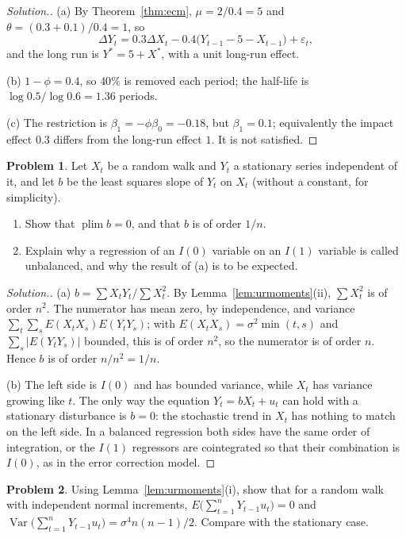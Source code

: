 \documentclass[11pt,a4paper]{article}
\numberwithin{equation}{section}
\DeclareMathOperator{\Var}{Var}
\DeclareMathOperator{\plim}{plim}
\theoremstyle{definition}
\newtheorem{problemx}{Problem}[subsection]
\newenvironment{problem}{\begin{problemx}}{\end{problemx}}
\newenvironment{solution}
  {\renewcommand{\qedsymbol}{}\begin{proof}[\textit{Solution}.]}
  {\end{proof}}
\begin{document}
\begin{solution}
(a) By Theorem~\ref{thm:ecm}, $\mu = 2/0.4 = 5$ and $\theta = (0.3 + 0.1)/0.4 = 1$, so
\[
\Delta Y_t = 0.3\Delta X_t - 0.4\bigl(Y_{t-1} - 5 - X_{t-1}\bigr) + \varepsilon_t ,
\]
and the long run is $Y^* = 5 + X^*$, with a unit long-run effect.

(b) $1 - \phi = 0.4$, so $40\%$ is removed each period; the half-life is $\log 0.5/\log 0.6 = 1.36$ periods.

(c) The restriction is $\beta_1 = -\phi\beta_0 = -0.18$, but $\beta_1 = 0.1$; equivalently the impact effect $0.3$ differs from the long-run effect $1$. It is not satisfied.
\end{solution}

\begin{problem}
\label{prob:unbalanced}
Let $X_t$ be a random walk and $Y_t$ a stationary series independent of it, and let $b$ be the least squares slope of $Y_t$ on $X_t$ (without a constant, for
simplicity).
\begin{enumerate}[label=(\alph*)]
\item Show that $\plim b = 0$, and that $b$ is of order $1/n$.
\item Explain why a regression of an $I(0)$ variable on an $I(1)$ variable is called unbalanced, and why the result of (a) is to be expected.
\end{enumerate}
\end{problem}

\begin{solution}
(a) $b = \sum X_tY_t/\sum X_t^2$. By Lemma~\ref{lem:urmoments}(ii), $\sum X_t^2$ is of order $n^2$. The numerator has mean zero, by independence, and variance
$\sum_t\sum_sE(X_tX_s)E(Y_tY_s)$; with $E(X_tX_s) = \sigma^2\min(t, s)$ and $\sum_s|E(Y_tY_s)|$ bounded, this is of order $n^2$, so the numerator is of order $n$. Hence $b$ is of
order $n/n^2 = 1/n$.

(b) The left side is $I(0)$ and has bounded variance, while $X_t$ has variance growing like $t$. The only way the equation $Y_t = bX_t + u_t$ can hold with
a stationary disturbance is $b = 0$: the stochastic trend in $X_t$ has nothing to match on the left side. In a balanced regression both sides have the
same order of integration, or the $I(1)$ regressors are cointegrated so that their combination is $I(0)$, as in the error correction model.
\end{solution}

\begin{problem}
Using Lemma~\ref{lem:urmoments}(i), show that for a random walk with independent normal increments, $E\bigl(\sum_{t=1}^nY_{t-1}u_t\bigr) = 0$ and
$\Var\bigl(\sum_{t=1}^nY_{t-1}u_t\bigr) = \sigma^4n(n - 1)/2$. Compare with the stationary case.
\end{problem}
\end{document}
